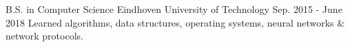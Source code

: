 
\begin{cventries}

  \cventry
    {B.S. in Computer Science} %
    {Eindhoven University of Technology} %
    {} %
    {Sep. 2015 - June 2018} %
    {
      {Learned algorithms, data structures, operating systems, neural networks \& network protocols.}
    }

\end{cventries}

